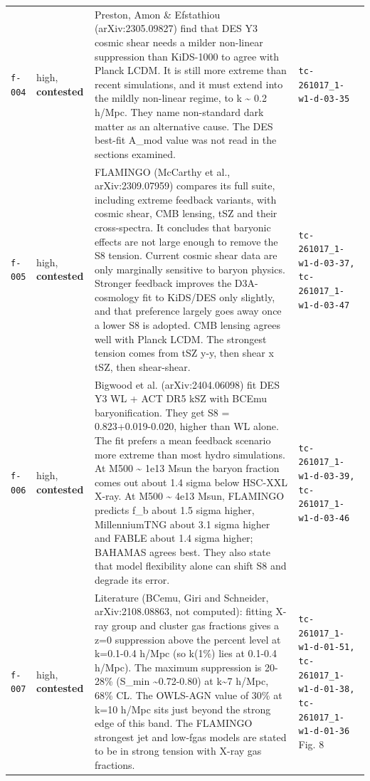 \documentclass[11pt,a4paper]{article}
\begin{document}
\begin{longtable}{@{}p{}p{}p{}p{}@{}}
\texttt{f-004} & high, \textbf{contested} & Preston, Amon \& Efstathiou (arXiv:2305.09827) find that DES Y3 cosmic shear needs a milder non-linear suppression than KiDS-1000 to agree with Planck LCDM. It is still more extreme than recent simulations, and it must extend into the mildly non-linear regime, to k \textasciitilde{} 0.2 h/Mpc. They name non-standard dark matter as an alternative cause. The DES best-fit A\_mod value was not read in the sections examined. & \texttt{tc-261017\_\allowbreak{}1-w1-d-03-35} \\
\texttt{f-005} & high, \textbf{contested} & FLAMINGO (McCarthy et al., arXiv:2309.07959) compares its full suite, including extreme feedback variants, with cosmic shear, CMB lensing, tSZ and their cross-spectra. It concludes that baryonic effects are not large enough to remove the S8 tension. Current cosmic shear data are only marginally sensitive to baryon physics. Stronger feedback improves the D3A-cosmology fit to KiDS/DES only slightly, and that preference largely goes away once a lower S8 is adopted. CMB lensing agrees well with Planck LCDM. The strongest tension comes from tSZ y-y, then shear x tSZ, then shear-shear. & \texttt{tc-261017\_\allowbreak{}1-w1-d-03-37,\allowbreak{} tc-261017\_\allowbreak{}1-w1-d-03-47} \\
\texttt{f-006} & high, \textbf{contested} & Bigwood et al. (arXiv:2404.06098) fit DES Y3 WL + ACT DR5 kSZ with BCEmu baryonification. They get S8 = 0.823+0.019-0.020, higher than WL alone. The fit prefers a mean feedback scenario more extreme than most hydro simulations. At M500 \textasciitilde{} 1e13 Msun the baryon fraction comes out about 1.4 sigma below HSC-XXL X-ray. At M500 \textasciitilde{} 4e13 Msun, FLAMINGO predicts f\_b about 1.5 sigma higher, MillenniumTNG about 3.1 sigma higher and FABLE about 1.4 sigma higher; BAHAMAS agrees best. They also state that model flexibility alone can shift S8 and degrade its error. & \texttt{tc-261017\_\allowbreak{}1-w1-d-03-39,\allowbreak{} tc-261017\_\allowbreak{}1-w1-d-03-46} \\
\texttt{f-007} & high, \textbf{contested} & Literature (BCemu, Giri and Schneider, arXiv:2108.08863, not computed): fitting X-ray group and cluster gas fractions gives a z=0 suppression above the percent level at k=0.1-0.4 h/Mpc (so k(1\%) lies at 0.1-0.4 h/Mpc). The maximum suppression is 20-28\% (S\_min \textasciitilde{}0.72-0.80) at k\textasciitilde{}7 h/Mpc, 68\% CL. The OWLS-AGN value of 30\% at k=10 h/Mpc sits just beyond the strong edge of this band. The FLAMINGO strongest jet and low-fgas models are stated to be in strong tension with X-ray gas fractions. & \texttt{tc-261017\_\allowbreak{}1-w1-d-01-51,\allowbreak{} tc-261017\_\allowbreak{}1-w1-d-01-38,\allowbreak{} tc-261017\_\allowbreak{}1-w1-d-01-36} Fig. 8 \\

\end{longtable}
\end{document}
